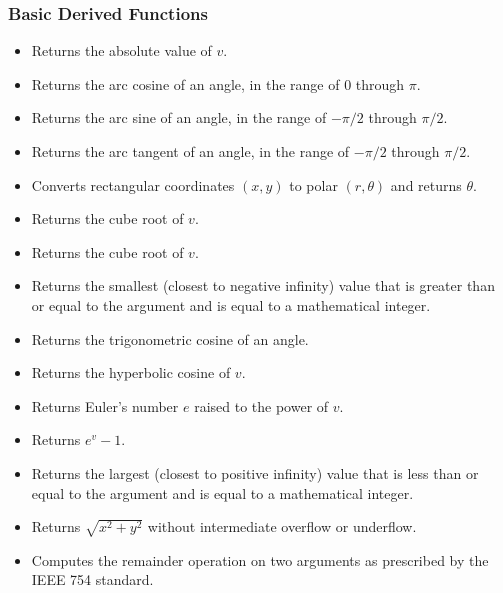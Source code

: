 \documentclass{article}
\begin{document}
\subsubsection{Basic Derived Functions}

\begin{itemize}
\item {\bf {} }   Returns the absolute value of $v$.
\item {\bf {} }   Returns the arc cosine of an angle, in the range of $0$ through $\pi$.
\item {\bf {} }   Returns the arc sine of an angle, in the range of $-\pi/2$ through $\pi/2$.
\item {\bf {} }   Returns the arc tangent of an angle, in the range of $-\pi/2$ through $\pi/2$.
\item {\bf {} }  Converts rectangular coordinates $(x, y)$ to polar $(r, \theta)$ and returns $\theta$.
\item {\bf {} }   Returns the cube root of $v$.
\item {\bf {} }   Returns the cube root of $v$.
\item {\bf {} }   Returns the smallest (closest to negative infinity) value that is greater than or equal to the argument and is equal to a mathematical integer.
\item {\bf {} }   Returns the trigonometric cosine of an angle.
\item {\bf {} }   Returns the hyperbolic cosine of $v$.
\item {\bf {} }   Returns Euler's number $e$ raised to the power of $v$.
\item {\bf {} }   Returns $e^v -1$.
\item {\bf {} }   Returns the largest (closest to positive infinity) value that is less than or equal to the argument and is equal to a mathematical integer.
\item {\bf {} }   Returns $\sqrt{x^2 + y^2}$ without intermediate overflow or underflow.
\item {\bf {} }   Computes the remainder operation on two arguments as prescribed by the IEEE 754 standard.

\end{itemize}
\end{document}
